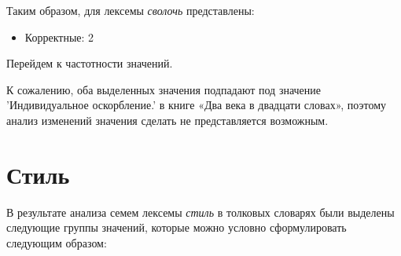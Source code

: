 Таким образом, для лексемы \textit{сволочь} представлены:

\begin{itemize}
    \item Корректные: 2
\end{itemize}

Перейдем к частотности значений.

К сожалению, оба выделенных значения подпадают под значение ’Индивидуальное оскорбление.’
в книге «Два века в двадцати словах», поэтому анализ изменений значения
сделать не представляется возможным.

\section*{Стиль}

В результате анализа семем лексемы \textit{стиль} в толковых словарях были выделены следующие группы значений,
которые можно условно сформулировать следующим образом:

